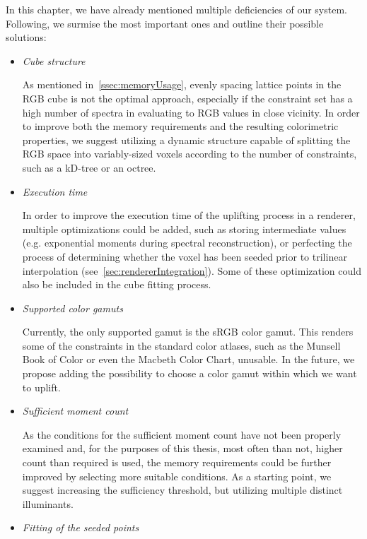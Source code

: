 In this chapter, we have already mentioned multiple deficiencies of our system. Following, we surmise the most important ones and outline their possible solutions:
\begin{itemize}
	\item{\emph{Cube structure}}
	
	As mentioned in~\cref{ssec:memoryUsage}, evenly spacing lattice points in the RGB cube is not the optimal approach, especially if the constraint set has a high number of spectra in evaluating to RGB values in close vicinity. In order to improve both the memory requirements and the resulting colorimetric properties, we suggest utilizing a dynamic structure capable of splitting the RGB space into variably-sized voxels according to the number of constraints, such as a kD-tree or an octree.
	
	\item{\emph{Execution time}}
	
	In order to improve the execution time of the uplifting process in a renderer, multiple optimizations could be added, such as storing intermediate values (e.g. exponential moments during spectral reconstruction), or perfecting the process of determining whether the voxel has been seeded prior to trilinear interpolation (see~\cref{sec:rendererIntegration}). Some of these optimization could also be included in the cube fitting process.
	
	\item{\emph{Supported color gamuts}}
	
	Currently, the only supported gamut is the sRGB color gamut. This renders some of the constraints in the standard color atlases, such as the Munsell Book of Color or even the Macbeth Color Chart, unusable. In the future, we propose adding the possibility to choose a color gamut within which we want to uplift.
	
	
	\item{\emph{Sufficient moment count}}
	
	As the conditions for the sufficient moment count have not been properly examined and, for the purposes of this thesis, most often than not, higher count than required is used, the memory requirements could be further improved by selecting more suitable conditions. As a starting point, we suggest increasing the sufficiency threshold, but utilizing multiple distinct illuminants.
	
	\item{\emph{Fitting of the seeded points}}
	

\end{itemize}
